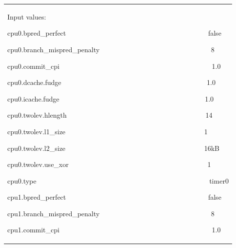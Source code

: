 \documentclass[a4paper]{article}
\begin{document}
\begin{flushleft}
\tablehead{}
\begin{tiny}
\begin{supertabular}{|m{6.34626in}|}
\hline
{\ttfamily Input values:}

{\ttfamily cpu0.bpred\_perfect
\ \ \ \ \ \ \ \ \ \ \ \ \ \ \ \ \ \ \ \ \ \ \ \ \ \ \ \ \ \ \ \ \ \ \ \ \ \ \ \ \ false}

{\ttfamily
cpu0.branch\_mispred\_penalty
\ \ \ \ \ \ \ \ \ \ \ \ \ \ \ \ \ \ \ \ \ \ \ \ \ \ \ \ \ \ \ \ 8}

{\ttfamily cpu0.commit\_cpi
\ \ \ \ \ \ \ \ \ \ \ \ \ \ \ \ \ \ \ \ \ \ \ \ \ \ \ \ \ \ \ \ \ \ \ \ \ \ \ \ \ \ \ \ 1.0}

{\ttfamily cpu0.dcache.fudge
\ \ \ \ \ \ \ \ \ \ \ \ \ \ \ \ \ \ \ \ \ \ \ \ \ \ \ \ \ \ \ \ \ \ \ \ \ \ \ \ \ \ 1.0}

{\ttfamily cpu0.icache.fudge
\ \ \ \ \ \ \ \ \ \ \ \ \ \ \ \ \ \ \ \ \ \ \ \ \ \ \ \ \ \ \ \ \ \ \ \ \ \ \ \ \ \ 1.0}

{\ttfamily cpu0.twolev.hlength
\ \ \ \ \ \ \ \ \ \ \ \ \ \ \ \ \ \ \ \ \ \ \ \ \ \ \ \ \ \ \ \ \ \ \ \ \ \ \ \ 14}

{\ttfamily cpu0.twolev.l1\_size
\ \ \ \ \ \ \ \ \ \ \ \ \ \ \ \ \ \ \ \ \ \ \ \ \ \ \ \ \ \ \ \ \ \ \ \ \ \ \ \ 1}

{\ttfamily cpu0.twolev.l2\_size
\ \ \ \ \ \ \ \ \ \ \ \ \ \ \ \ \ \ \ \ \ \ \ \ \ \ \ \ \ \ \ \ \ \ \ \ \ \ \ \ 16kB}

{\ttfamily cpu0.twolev.use\_xor
\ \ \ \ \ \ \ \ \ \ \ \ \ \ \ \ \ \ \ \ \ \ \ \ \ \ \ \ \ \ \ \ \ \ \ \ \ \ \ \ 1}

{\ttfamily cpu0.type
\ \ \ \ \ \ \ \ \ \ \ \ \ \ \ \ \ \ \ \ \ \ \ \ \ \ \ \ \ \ \ \ \ \ \ \ \ \ \ \ \ \ \ \ \ \ \ \ \ \ timer0}

{\ttfamily cpu1.bpred\_perfect
\ \ \ \ \ \ \ \ \ \ \ \ \ \ \ \ \ \ \ \ \ \ \ \ \ \ \ \ \ \ \ \ \ \ \ \ \ \ \ \ \ false}

{\ttfamily
cpu1.branch\_mispred\_penalty
\ \ \ \ \ \ \ \ \ \ \ \ \ \ \ \ \ \ \ \ \ \ \ \ \ \ \ \ \ \ \ \ 8}

{\ttfamily cpu1.commit\_cpi
\ \ \ \ \ \ \ \ \ \ \ \ \ \ \ \ \ \ \ \ \ \ \ \ \ \ \ \ \ \ \ \ \ \ \ \ \ \ \ \ \ \ \ \ 1.0}


\end{supertabular}
\end{tiny}
\end{flushleft}
\end{document}
